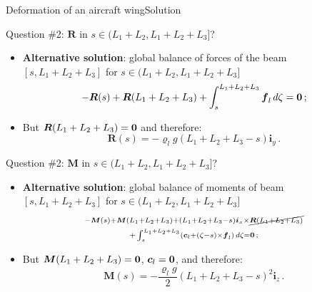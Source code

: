 \documentclass{beamer}
\newcommand{\id}{d}
\newcommand{\cj}{c}
\newcommand{\cv}{{\boldsymbol\cj}}
\newcommand{\xj}{x}
\newcommand{\yj}{y}
\newcommand{\zj}{z}
\renewcommand{\ij}{i}
\newcommand{\iv}{{\boldsymbol\ij}}
\newcommand{\fj}{f}
\newcommand{\fv}{{\boldsymbol\fj}}
\newcommand{\roi}{\varrho}
\newcommand{\Fresj}{R}
\newcommand{\Mresj}{M}
\newcommand{\Fres}{{\boldsymbol\Fresj}}
\newcommand{\Mres}{{\boldsymbol\Mresj}}
\newcommand{\bzero}{{\bf 0}}
\begin{document}
\begin{frame}{Deformation of an aircraft wing}{Solution}
\begin{overprint}
\vskip-20pt
\begin{exampleblock}{Question \#2: $\Fres$ in $s\in(L_1+L_2,L_1+L_2+L_3]$?}
\begin{itemize}
\item {\bf Alternative solution}: global balance of forces of the beam $[s,L_1+L_2+L_3]$ for $s\in(L_1+L_2,L_1+L_2+L_3]$
\begin{displaymath}
-\Fres(s)+\Fres(L_1+L_2+L_3)+\int_s^{L_1+L_2+L_3}\fv_l\,\id\zeta=\bzero\,;
\end{displaymath}
\item But $\Fres(L_1+L_2+L_3)=\bzero$ and therefore:
\begin{displaymath}
\Fres(s)=-\roi_l g(L_1+L_2+L_3-s)\iv_\yj\,.
\end{displaymath}
\end{itemize}
\end{exampleblock}

\vskip-20pt
\begin{exampleblock}{Question \#2: $\Mres$ in $s\in(L_1+L_2,L_1+L_2+L_3]$?}
\begin{itemize}
\item {\bf Alternative solution}: global balance of moments of beam $[s,L_1+L_2+L_3]$ for $s\in(L_1+L_2,L_1+L_2+L_3]$
\begin{multline*}
\scriptstyle -\Mres(s)+\Mres(L_1+L_2+L_3)+(L_1+L_2+L_3-s)\iv_\xj\times\cancel{\Fres(L_1+L_2+L_3)} \\
\scriptstyle +\int_s^{L_1+L_2+L_3}(\cv_l+(\zeta-s)\times\fv_l)\,\id\zeta=\bzero\,;
\end{multline*}
\item But $\Mres(L_1+L_2+L_3)=\bzero$, $\cv_l=\bzero$, and therefore:
\begin{displaymath}
\Mres(s)=-\frac{\roi_l g}{2}(L_1+L_2+L_3-s)^2\iv_\zj\,.
\end{displaymath}
\end{itemize}
\end{exampleblock}

\end{overprint}

\end{frame}
\end{document}
